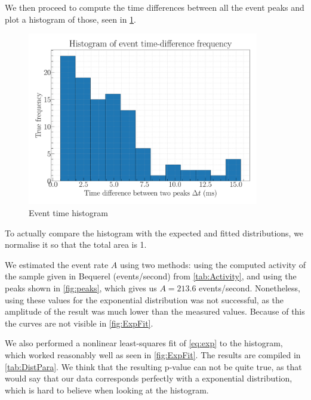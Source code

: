 We then proceed to compute the time differences between all the event peaks and plot a histogram of those, seen in \cref{fig:expHist}.

\begin{figure}[H]
\centering
\includegraphics[width=0.9\textwidth]{../Figures/Geiger_eventtime_histogram_unnormalized.pdf}
\caption{Event time histogram}
\label{fig:expHist}
\end{figure}

To actually compare the histogram with the expected and fitted distributions, we normalise it so that the total area is 1.

We estimated the event rate $A$ using two methods: using the computed activity of the sample given in Bequerel (events/second) from \cref{tab:Activity}, and using the peaks shown in \cref{fig:peaks}, which gives us $A = 213.6 $ events/second. Nonetheless, using these values for the exponential distribution was not successful, as the amplitude of the result was much lower than the measured values. Because of this the curves are not visible in \cref{fig:ExpFit}.

We also performed a nonlinear least-squares fit of \cref{eq:exp} to the histogram, which worked reasonably well as seen in \cref{fig:ExpFit}. 
The results are compiled in \cref{tab:DistPara}. We think that the resulting p-value can not be quite true, as that would say that our data corresponds perfectly with a exponential distribution, which is hard to believe when looking at the histogram.

